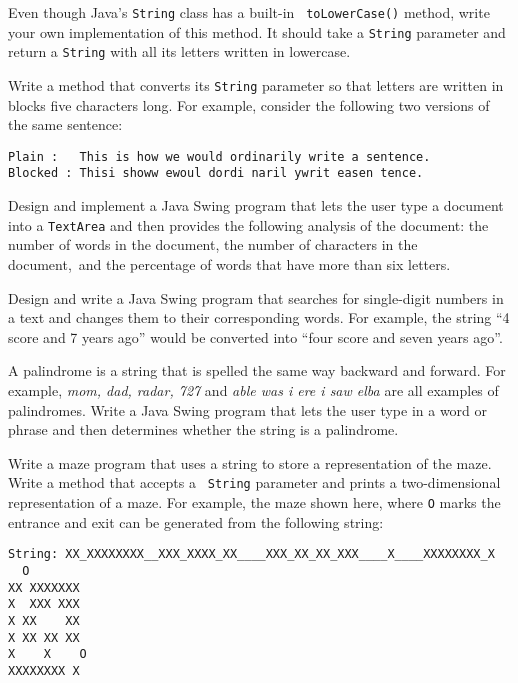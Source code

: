 \begin{EXRtwo}
\item Even though Java's {\tt String} class has a built-in {\tt
toLowerCase()} method, write your own implementation of this method.
It should take a {\tt String} parameter and return a {\tt String}
with all its letters written in lowercase.

\item Write a method that converts its {\tt String} parameter so that
letters are written in blocks five characters long.  For example,
consider the following two versions of the same sentence:

\begin{jjjlisting}
\begin{lstlisting}
Plain :   This is how we would ordinarily write a sentence.
Blocked : Thisi showw ewoul dordi naril ywrit easen tence.
\end{lstlisting}
\end{jjjlisting}

\item  Design and implement a Java Swing program that lets the user type a document
into a {\tt TextArea} and then provides the following analysis of the
document: the number of words in the document, the number of
characters in the document,~and the percentage of words that have more
than six letters.

\item  Design and write a Java Swing program that searches for single-digit numbers
in a text and changes them to their corresponding words.  For example,
the string ``4 score and 7 years ago'' would be converted into ``four
score and seven years ago''.

\item  A palindrome is a string that is spelled the same way backward
and forward.  For example, {\it mom, dad, radar, 727} and
{\it able was i ere i saw elba} are all examples of palindromes.
Write a Java Swing program that lets the user type in a word or phrase
and then determines whether the string is a palindrome.

\item Write a maze program that uses a string to store a
representation of the maze.  Write a method that accepts a {\tt
String} parameter and prints a two-dimensional representation of a
maze. For example, the maze shown here, where {\tt O} marks the
entrance and exit can be generated from the following string:

\begin{jjjlisting}
\begin{lstlisting}[basicstyle=\scriptsize]
String: XX_XXXXXXXX__XXX_XXXX_XX____XXX_XX_XX_XXX____X____XXXXXXXX_X
  O
XX XXXXXXX
X  XXX XXX
X XX    XX
X XX XX XX
X    X    O
XXXXXXXX X
\end{lstlisting}
\end{jjjlisting}



\end{EXRtwo}
